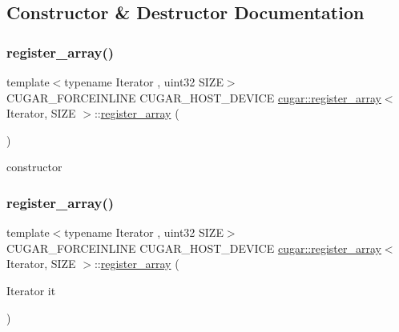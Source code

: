 \subsection{Constructor \& Destructor Documentation}
\mbox{\label{structcugar_1_1register__array_a44e755faa53196a2d7abdfbd19b388ef}} 
\subsubsection{\texorpdfstring{register\+\_\+array()}{register\_array()}\hspace{0.1cm}{\footnotesize\ttfamily [1/2]}}
{\footnotesize\ttfamily template$<$typename Iterator , uint32 S\+I\+ZE$>$ \\
C\+U\+G\+A\+R\+\_\+\+F\+O\+R\+C\+E\+I\+N\+L\+I\+NE C\+U\+G\+A\+R\+\_\+\+H\+O\+S\+T\+\_\+\+D\+E\+V\+I\+CE \hyperlink{structcugar_1_1register__array}{cugar\+::register\+\_\+array}$<$ Iterator, S\+I\+ZE $>$\+::\hyperlink{structcugar_1_1register__array}{register\+\_\+array} (\begin{DoxyParamCaption}{ }\end{DoxyParamCaption})\hspace{0.3cm}{\ttfamily [inline]}}

constructor \mbox{\label{structcugar_1_1register__array_aa8482612bb61cc0e501d1e5da1c43ab0}} 
\subsubsection{\texorpdfstring{register\+\_\+array()}{register\_array()}\hspace{0.1cm}{\footnotesize\ttfamily [2/2]}}
{\footnotesize\ttfamily template$<$typename Iterator , uint32 S\+I\+ZE$>$ \\
C\+U\+G\+A\+R\+\_\+\+F\+O\+R\+C\+E\+I\+N\+L\+I\+NE C\+U\+G\+A\+R\+\_\+\+H\+O\+S\+T\+\_\+\+D\+E\+V\+I\+CE \hyperlink{structcugar_1_1register__array}{cugar\+::register\+\_\+array}$<$ Iterator, S\+I\+ZE $>$\+::\hyperlink{structcugar_1_1register__array}{register\+\_\+array} (\begin{DoxyParamCaption}\item[{Iterator}]{it }\end{DoxyParamCaption})\hspace{0.3cm}{\ttfamily [inline]}}

